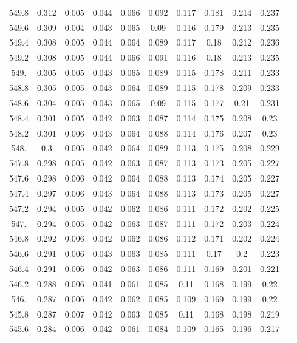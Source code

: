 \documentclass[12pt]{ctexart}
\numberwithin{equation}{section}
\begin{document}
\begin{longtable}{ccccccccccc}
549.8	&	0.312	&	0.005	&	0.044	&	0.066	&	0.092	&	0.117	&	0.181	&	0.214	&	0.237	\\
549.6	&	0.309	&	0.004	&	0.043	&	0.065	&	0.09	&	0.116	&	0.179	&	0.213	&	0.235	\\
549.4	&	0.308	&	0.005	&	0.044	&	0.064	&	0.089	&	0.117	&	0.18	&	0.212	&	0.236	\\
549.2	&	0.308	&	0.005	&	0.044	&	0.066	&	0.091	&	0.116	&	0.18	&	0.213	&	0.235	\\
549.	&	0.305	&	0.005	&	0.043	&	0.065	&	0.089	&	0.115	&	0.178	&	0.211	&	0.233	\\
548.8	&	0.305	&	0.005	&	0.043	&	0.064	&	0.089	&	0.115	&	0.178	&	0.209	&	0.233	\\
548.6	&	0.304	&	0.005	&	0.043	&	0.065	&	0.09	&	0.115	&	0.177	&	0.21	&	0.231	\\
548.4	&	0.301	&	0.005	&	0.042	&	0.063	&	0.087	&	0.114	&	0.175	&	0.208	&	0.23	\\
548.2	&	0.301	&	0.006	&	0.043	&	0.064	&	0.088	&	0.114	&	0.176	&	0.207	&	0.23	\\
548.	&	0.3	&	0.005	&	0.042	&	0.064	&	0.089	&	0.113	&	0.175	&	0.208	&	0.229	\\
547.8	&	0.298	&	0.005	&	0.042	&	0.063	&	0.087	&	0.113	&	0.173	&	0.205	&	0.227	\\
547.6	&	0.298	&	0.006	&	0.042	&	0.064	&	0.088	&	0.113	&	0.174	&	0.205	&	0.227	\\
547.4	&	0.297	&	0.006	&	0.043	&	0.064	&	0.088	&	0.113	&	0.173	&	0.205	&	0.227	\\
547.2	&	0.294	&	0.005	&	0.042	&	0.062	&	0.086	&	0.111	&	0.172	&	0.202	&	0.225	\\
547.	&	0.294	&	0.005	&	0.042	&	0.063	&	0.087	&	0.111	&	0.172	&	0.203	&	0.224	\\
546.8	&	0.292	&	0.006	&	0.042	&	0.062	&	0.086	&	0.112	&	0.171	&	0.202	&	0.224	\\
546.6	&	0.291	&	0.006	&	0.043	&	0.063	&	0.085	&	0.111	&	0.17	&	0.2	&	0.223	\\
546.4	&	0.291	&	0.006	&	0.042	&	0.063	&	0.086	&	0.111	&	0.169	&	0.201	&	0.221	\\
546.2	&	0.288	&	0.006	&	0.041	&	0.061	&	0.085	&	0.11	&	0.168	&	0.199	&	0.22	\\
546.	&	0.287	&	0.006	&	0.042	&	0.062	&	0.085	&	0.109	&	0.169	&	0.199	&	0.22	\\
545.8	&	0.287	&	0.007	&	0.042	&	0.063	&	0.085	&	0.11	&	0.168	&	0.198	&	0.219	\\
545.6	&	0.284	&	0.006	&	0.042	&	0.061	&	0.084	&	0.109	&	0.165	&	0.196	&	0.217	\\

\end{longtable}
\end{document}
